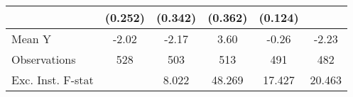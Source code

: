 {\begin{tabular}{l*{5}{c}}
            &     (0.252)         &     (0.342)         &     (0.362)         &     (0.124)         &                     \\
\midrule
Mean Y      &       -2.02         &       -2.17         &        3.60         &       -0.26         &       -2.23         \\
Observations&         528         &         503         &         513         &         491         &         482         \\
Exc. Inst. F-stat&                     &       8.022         &      48.269         &      17.427         &      20.463         \\
\bottomrule
\end{tabular}
}
